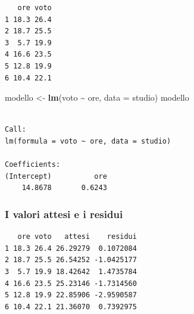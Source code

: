 \documentclass[
  a4paper,
  DIV=11,
  numbers=noendperiod]{scrreprt}
\newenvironment{Shaded}{\begin{snugshade}}{\end{snugshade}}
\newcommand{\AttributeTok}[1]{\textcolor[rgb]{0.13,0.29,0.53}{#1}}
\newcommand{\CommentTok}[1]{\textcolor[rgb]{0.56,0.35,0.01}{\textit{#1}}}
\newcommand{\FunctionTok}[1]{\textcolor[rgb]{0.13,0.29,0.53}{\textbf{#1}}}
\newcommand{\NormalTok}[1]{#1}
\newcommand{\OtherTok}[1]{\textcolor[rgb]{0.56,0.35,0.01}{#1}}
\newcommand{\SpecialCharTok}[1]{\textcolor[rgb]{0.81,0.36,0.00}{\textbf{#1}}}
\begin{document}
\begin{verbatim}
   ore voto
1 18.3 26.4
2 18.7 25.5
3  5.7 19.9
4 16.6 23.5
5 12.8 19.9
6 10.4 22.1
\end{verbatim}

\begin{Shaded}
\begin{Highlighting}[]
\NormalTok{modello }\OtherTok{\textless{}{-}} \FunctionTok{lm}\NormalTok{(voto }\SpecialCharTok{\textasciitilde{}}\NormalTok{ ore, }\AttributeTok{data =}\NormalTok{ studio)}
\NormalTok{modello}
\end{Highlighting}
\end{Shaded}

\begin{verbatim}

Call:
lm(formula = voto ~ ore, data = studio)

Coefficients:
(Intercept)          ore  
    14.8678       0.6243  
\end{verbatim}

\subsubsection{I valori attesi e i
residui}\label{i-valori-attesi-e-i-residui}

\begin{Shaded}
\end{Shaded}

\begin{verbatim}
   ore voto   attesi    residui
1 18.3 26.4 26.29279  0.1072084
2 18.7 25.5 26.54252 -1.0425177
3  5.7 19.9 18.42642  1.4735784
4 16.6 23.5 25.23146 -1.7314560
5 12.8 19.9 22.85906 -2.9590587
6 10.4 22.1 21.36070  0.7392975
\end{verbatim}

\begin{Shaded}
\end{Shaded}
\end{document}
